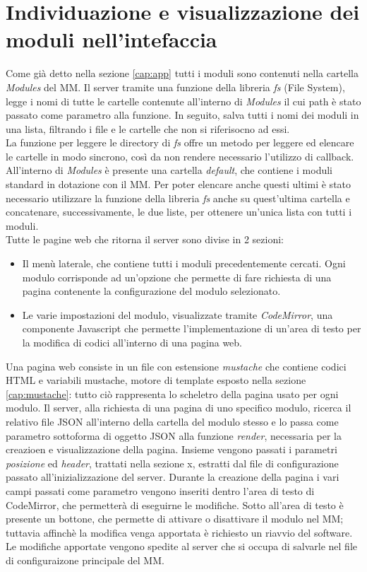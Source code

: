 \section{Individuazione e visualizzazione dei moduli nell'intefaccia}
Come già detto nella sezione \ref{cap:app} tutti i moduli sono contenuti nella
cartella \textit{Modules} del MM. Il server tramite una funzione della libreria \textit{fs} (File System),
legge i nomi di tutte le cartelle contenute all'interno di \textit{Modules} il cui path è stato passato
come parametro alla funzione. In seguito, salva tutti i nomi dei moduli
in una lista, filtrando i file e le cartelle che non si riferisocno ad essi.\\
La funzione per leggere le directory di \textit{fs} offre un metodo per leggere ed elencare le cartelle in
modo sincrono, così da non rendere necessario l'utilizzo di callback.
All'interno di \textit{Modules} è presente una cartella \textit{default}, che contiene
i moduli standard in dotazione con il MM. Per poter elencare anche questi ultimi è stato necessario utilizzare la funzione
della libreria \textit{fs} anche su quest'ultima cartella e concatenare, successivamente, le due liste,
per ottenere un'unica lista con tutti i moduli.\\
Tutte le pagine web che ritorna il server sono divise in 2 sezioni:
\begin{itemize}
\item Il menù laterale, che contiene tutti i moduli precedentemente cercati. Ogni modulo corrisponde ad un'opzione che permette di fare richiesta di una pagina
contenente la configurazione del modulo selezionato.
\item Le varie impostazioni del modulo, visualizzate tramite \textit{CodeMirror}, una componente Javascript
che permette l'implementazione di un'area di testo per la modifica di codici all'interno di una pagina web.\\[1\baselineskip]
\end{itemize}
Una pagina web consiste in un file con estensione \textit{mustache} che contiene
codici HTML e variabili mustache, motore di template esposto nella sezione \ref{cap:mustache}: tutto ciò rappresenta lo
scheletro della pagina usato per ogni modulo.
Il server, alla richiesta di una pagina di uno specifico modulo, ricerca il relativo file JSON all'interno della cartella del modulo stesso e lo
passa come parametro sottoforma di oggetto JSON alla funzione \textit{render}, necessaria per la creazioen e visualizzazione della pagina.
Insieme vengono passati i parametri \textit{posizione} ed \textit{header}, trattati nella sezione x, estratti dal file
di configurazione passato all'inizializzazione del server.
Durante la creazione della pagina i vari campi passati come parametro vengono inseriti dentro l'area di testo di CodeMirror, che permetterà di eseguirne
le modifiche. Sotto all'area di testo è presente un bottone, che permette di attivare o disattivare il modulo nel MM; tuttavia affinchè la modifica
venga apportata è richiesto un riavvio del software. Le modifiche apportate vengono spedite al server che si occupa di salvarle nel file di configuraizone
principale del MM.
